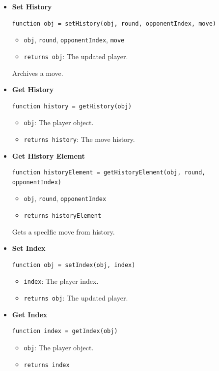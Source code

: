 \documentclass[12pt]{report}
\begin{document}
\begin{itemize}
  \item \textbf{Set History}
  \begin{verbatim}
function obj = setHistory(obj, round, opponentIndex, move)
  \end{verbatim}
  \begin{itemize}
    \item \texttt{obj}, \texttt{round}, \texttt{opponentIndex}, \texttt{move}
    \item \texttt{returns obj}: The updated player.
  \end{itemize}
  Archives a move.

  \item \textbf{Get History}
  \begin{verbatim}
function history = getHistory(obj)
  \end{verbatim}
  \begin{itemize}
    \item \texttt{obj}: The player object.
    \item \texttt{returns history}: The move history.
  \end{itemize}

  \item \textbf{Get History Element}
  \begin{verbatim}
function historyElement = getHistoryElement(obj, round, opponentIndex)
  \end{verbatim}
  \begin{itemize}
    \item \texttt{obj}, \texttt{round}, \texttt{opponentIndex}
    \item \texttt{returns historyElement}
  \end{itemize}
  Gets a specIfic move from history.

  \item \textbf{Set Index}
  \begin{verbatim}
function obj = setIndex(obj, index)
  \end{verbatim}
  \begin{itemize}
    \item \texttt{index}: The player index.
    \item \texttt{returns obj}: The updated player.
  \end{itemize}

  \item \textbf{Get Index}
  \begin{verbatim}
function index = getIndex(obj)
  \end{verbatim}
  \begin{itemize}
    \item \texttt{obj}: The player object.
    \item \texttt{returns index}
  \end{itemize}


\end{itemize}
\end{document}
